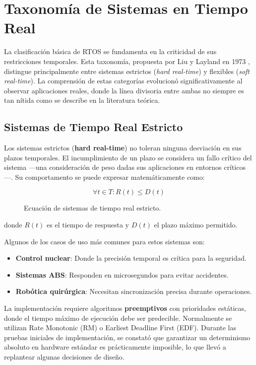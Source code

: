 \section{Taxonomía de Sistemas en Tiempo Real}
    La clasificación básica de RTOS se fundamenta en la criticidad de sus restricciones temporales. Esta taxonomía, propuesta por Liu y Layland en 1973 \cite{Siewert_Pratt_2016}, distingue principalmente entre sistemas estrictos (\textit{hard real-time}) y flexibles (\textit{soft real-time}). La comprensión de estas categorías evolucionó significativamente al observar aplicaciones reales, donde la línea divisoria entre ambas no siempre es tan nítida como se describe en la literatura teórica.

    \subsection{Sistemas de Tiempo Real Estricto}
        Los sistemas estrictos (\textbf{hard real-time}) no toleran ninguna desviación en sus plazos temporales. El incumplimiento de un plazo se considera un fallo crítico del sistema —una consideración de peso dadas sus aplicaciones en entornos críticos—. Su comportamento se puede expresar matemáticamente como:

        \begin{figure}[h!]
            \centering
            \begin{equation}
                \forall t \in T: R(t) \leq D(t)
            \end{equation}
            \caption{Ecuación de sistemas de tiempo real estricto.}
            \label{fig:hard_real_time_equation}
        \end{figure}

        donde $R(t)$ es el tiempo de respuesta y $D(t)$ el plazo máximo permitido.

        Algunos de los casos de uso más comunes para estos sistemas son:
        \begin{itemize}
            \item \textbf{Control nuclear}: Donde la precisión temporal es crítica para la seguridad.
            \item \textbf{Sistemas ABS}: Responden en microsegundos para evitar accidentes.
            \item \textbf{Robótica quirúrgica}: Necesitan sincronización precisa durante operaciones.
        \end{itemize}

    La implementación requiere algoritmos \textbf{preemptivos} con prioridades estáticas, donde el tiempo máximo de ejecución debe ser predecible. Normalmente se utilizan Rate Monotonic (RM) o Earliest Deadline First (EDF). Durante las pruebas iniciales de implementación, se constató que garantizar un determinismo absoluto en hardware estándar es prácticamente imposible, lo que llevó a replantear algunas decisiones de diseño.

